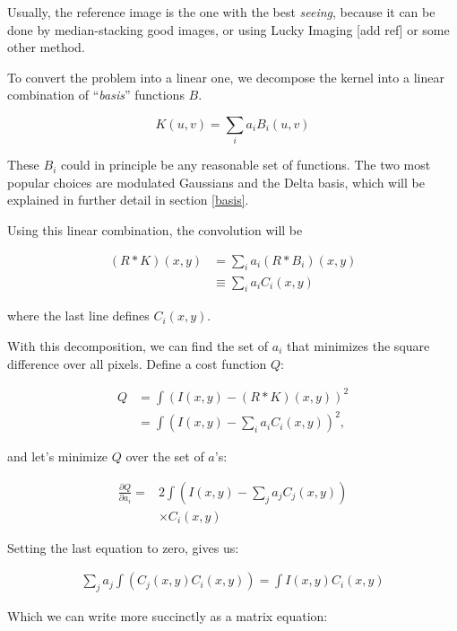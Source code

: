 Usually, the reference image is the one with the best {\em seeing}, 
because it can be done by median-stacking good images, or using Lucky Imaging [add ref] or some other method.

To convert the problem into a linear one, we decompose the kernel into a linear combination of ``{\em basis}'' functions $B$.

\begin{equation} \label{kernel_linear}
K(u,v) = \sum_{i} a_{i} B_{i}(u,v)
\end{equation}

These $B_{i}$ could in principle be any reasonable set of functions. 
The two most popular choices are modulated Gaussians and the Delta basis, which will be explained in further detail in section \ref{basis}.

Using this linear combination, the convolution will be

\begin{align}
(R \mathbin{*} K)(x,y) & = \sum_{i} a_{i} \left( R \mathbin{*} B_{i} \right)(x,y) \\
 & \equiv \sum_{i} a_{i} C_{i}(x,y)
\end{align}

where the last line defines $C_{i}(x,y)$.

With this decomposition, we can find the set of $a_{i}$ that minimizes the square difference over all pixels.
Define a cost function $Q$:

\begin{align}
Q &= \int \left( I(x,y) - (R \mathbin{*} K)(x,y) \right)^2 \\
 & = \int \left( I(x,y) - \sum_{i} a_{i} C_{i}(x,y) \right)^2,
\end{align}

and let's minimize $Q$ over the set of $a$'s:

\begin{align}
\frac{\partial Q}{\partial a_{i}} = & 2 \int \left( I(x,y) - \sum_{j} a_{j} C_{j}(x,y) \right) \\
                             & \times C_{i}(x,y) 
\end{align}

Setting the last equation to zero, gives us:

\begin{align}
\sum_{j} a_{j} \int \left( C_{j}(x,y)  C_{i}(x,y) \right) =  \int I(x,y) C_{i}(x,y) 
\end{align}

Which we can write more succinctly as a matrix equation:

